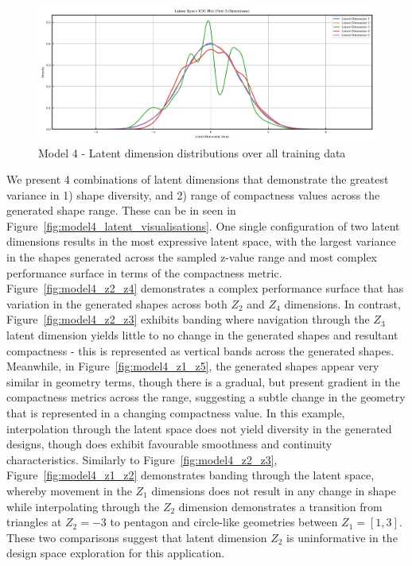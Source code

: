 \documentclass{article}
\begin{document}
\begin{figure}[H]
    \centering
    \includegraphics[width=0.75\linewidth]{figures/VAEmodels/model4/latent_distribution.png}
    \caption{Model 4 - Latent dimension distributions over all training data}
    \label{fig:model4_latent_dist}
\end{figure}

We present 4 combinations of latent dimensions that demonstrate the greatest variance in 1) shape diversity, and 2) range of compactness values across the generated shape range. These can be in seen in Figure~\ref{fig:model4_latent_visualisations}. One single configuration of two latent dimensions results in the most expressive latent space, with the largest variance in the shapes generated across the sampled z-value range and most complex performance surface in terms of the compactness metric. Figure~\ref{fig:model4_z2_z4} demonstrates a complex performance surface that has variation in the generated shapes across both $Z_2$ and $Z_4$ dimensions. In contrast, Figure~\ref{fig:model4_z2_z3} exhibits banding where navigation through the $Z_3$ latent dimension yields little to no change in the generated shapes and resultant compactness - this is represented as vertical bands across the generated  shapes. Meanwhile, in Figure~\ref{fig:model4_z1_z5}, the generated shapes appear very similar in geometry terms, though there is a gradual, but present gradient in the compactness metrics across the range, suggesting a subtle change in the geometry that is represented in a changing compactness value. In this example, interpolation through the latent space does not yield diversity in the generated designs, though does exhibit favourable smoothness and continuity characteristics. Similarly to Figure~\ref{fig:model4_z2_z3}, Figure~\ref{fig:model4_z1_z2} demonstrates banding through the latent space, whereby movement in the $Z_1$ dimensions does not result in any change in shape while interpolating through the $Z_2$ dimension demonstrates a transition from triangles at $Z_2=-3$ to pentagon and circle-like geometries between $Z_1=[1,3]$. These two comparisons suggest that latent dimension $Z_2$ is uninformative in the design space exploration for this application.
\end{document}
